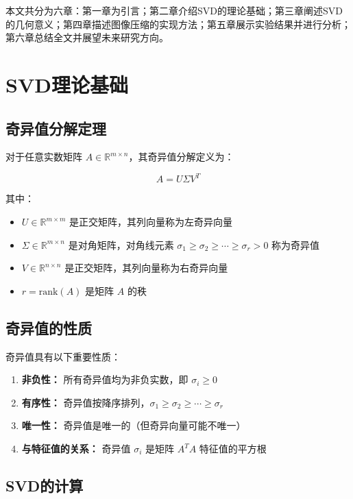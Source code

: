 \documentclass[12pt,a4paper]{article}
\begin{document}
本文共分为六章：第一章为引言；第二章介绍SVD的理论基础；第三章阐述SVD的几何意义；第四章描述图像压缩的实现方法；第五章展示实验结果并进行分析；第六章总结全文并展望未来研究方向。

\section{SVD理论基础}

\subsection{奇异值分解定理}

对于任意实数矩阵 $A \in \mathbb{R}^{m \times n}$，其奇异值分解定义为：

\begin{equation}
    A = U\Sigma V^T
\end{equation}

其中：
\begin{itemize}
    \item $U \in \mathbb{R}^{m \times m}$ 是正交矩阵，其列向量称为左奇异向量
    \item $\Sigma \in \mathbb{R}^{m \times n}$ 是对角矩阵，对角线元素 $\sigma_1 \geq \sigma_2 \geq \cdots \geq \sigma_r > 0$ 称为奇异值
    \item $V \in \mathbb{R}^{n \times n}$ 是正交矩阵，其列向量称为右奇异向量
    \item $r = \text{rank}(A)$ 是矩阵 $A$ 的秩
\end{itemize}

\subsection{奇异值的性质}

奇异值具有以下重要性质：

\begin{enumerate}[label=(\arabic*)]
    \item \textbf{非负性：} 所有奇异值均为非负实数，即 $\sigma_i \geq 0$
    \item \textbf{有序性：} 奇异值按降序排列，$\sigma_1 \geq \sigma_2 \geq \cdots \geq \sigma_r$
    \item \textbf{唯一性：} 奇异值是唯一的（但奇异向量可能不唯一）
    \item \textbf{与特征值的关系：} 奇异值 $\sigma_i$ 是矩阵 $A^TA$ 特征值的平方根
\end{enumerate}

\subsection{SVD的计算}
\end{document}
